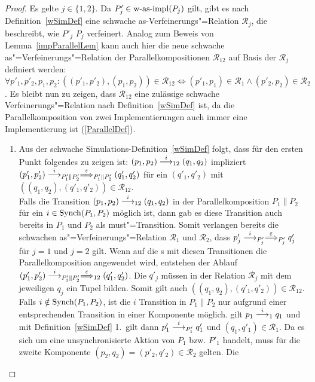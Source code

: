 \begin{proof}\mbox{}
  Es gelte $j\in\{1,2\}$. Da $P'_j\in\mathrm{w}\text{-}\mathrm{as}\text{-}\mathrm{impl} (P_j)$ gilt, gibt es nach
  Definition~\ref{wSimDef} eine schwache as-Verfeinerungs"=Relation
  $\mathcal{R}_j$, die beschreibt, wie $P'_j$ $P_j$ verfeinert. Analog zum
  Beweis von Lemma~\ref{impParallelLem} kann auch hier die neue schwache
  as"=Verfeinerungs"=Relation der Parallelkompositionen $\mathcal{R}_{12}$
  auf Basis der $\mathcal{R}_j$ definiert werden: $\forall p'_1,p'_2,p_1,p_2:
  ((p'_1,p'_2),(p_1,p_2))\in\mathcal{R}_{12} \Leftrightarrow
  (p'_1,p_1)\in\mathcal{R}_1 \land (p'_2,p_2)\in\mathcal{R}_2$. Es bleibt nun
  zu zeigen, dass $\mathcal{R}_{12}$ eine zulässige schwache
  Verfeinerungs"=Relation nach Definition~\ref{wSimDef} ist, da die
  Parallelkomposition von zwei Implementierungen auch immer eine
  Implementierung ist (\ref{ParallelDef}).
  \begin{enumerate}
    \item Aus der schwache Simulations-Definition~\ref{wSimDef} folgt, dass für
      den ersten Punkt folgendes zu zeigen ist:
      $(p_1,p_2)\must[i]_{12}(q_1,q_2)$ impliziert $(p'_1,p'_2)
      \must[i]_{P'_1\|P'_2} \weakmust[\varepsilon]_{P'_1\|P'_2} (q'_1,q'_2)$
      für ein $(q'_1,q'_2)$ mit $((q_1,q_2),(q'_1,q'_2))\in\mathcal{R}_{12}$.\\
      Falls die Transition $(p_1,p_2)\must[i]_{12}(q_1,q_2)$ in der
      Parallelkomposition $P_1\|P_2$ für ein $i\in\mathrm{Synch}(P_1,P_2)$ möglich ist,
      dann gab es diese Transition auch bereits in $P_1$ und $P_2$ als
      must"=Transition. Somit verlangen bereits die schwachen
      as"=Verfeinerungs"=Relation $\mathcal{R}_1$ und $\mathcal{R}_2$, dass
      $p'_j\must[i]_{P'_j}\weakmust[\varepsilon]_{P'_j}q'_j$ für $j=1$ und
      $j=2$ gilt. Wenn auf die \MEIO{}s mit diesen Transitionen die
      Parallelkomposition angewendet wird, entstehen der Ablauf
      $(p'_1,p'_2) \must[i]_{P'_1\|P'_2} \weakmust[\varepsilon]_{12}
      (q'_1,q'_2)$. Die $q'_j$ müssen in der  Relation $\mathcal{R}_j$ mit dem
      jeweiligen $q_j$ ein Tupel bilden. Somit gilt auch
      $((q_1,q_2),(q'_1,q'_2))\in\mathcal{R}_{12}$. Falls $i\notin\mathrm{Synch}
      (P_1,P_2)$, ist die $i$ Transition in $P_1\|P_2$ nur aufgrund einer
      entsprechenden Transition in einer Komponente möglich. \OBdA{} gilt $p_1
      \must[i]_1 q_1$ und mit Definition~\ref{wSimDef} 1.\ gilt dann $p'_1
      \must[i]_{P'_1} q'_1$ und $(q_1,q'_1)\in\mathcal{R}_1$. Da es sich um
      eine unsynchronisierte Aktion von $P_1$ bzw. $P'_1$ handelt, muss für die
      zweite Komponente $(p_2,q_2)=(p'_2,q'_2)\in\mathcal{R}_2$ gelten. Die

\end{enumerate}
\end{proof}
